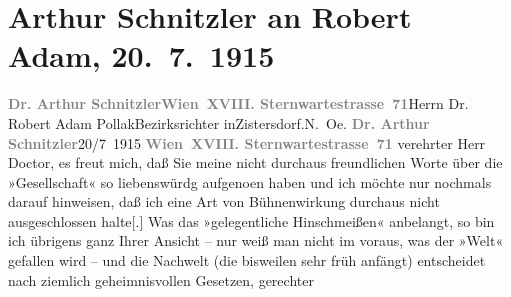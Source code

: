 

         
         \renewcommand{\erwaehntePersonen}{Personen: Robert Adam}
         \renewcommand{\erwaehnteOrte}{Orte: Niederösterreich, Sternwartestraße, Wien, XVIII., Währing, Zistersdorf}
         \renewcommand{\erwaehnteWerke}{Werke: Gesellschaft [Eine Gaunerkomödie], Rechtsphilosophie}
               \section[Arthur Schnitzler an Robert Adam, 20. 7. 1915]{ Arthur Schnitzler an Robert Adam, 20. 7. 1915}\nopagebreak{}\rehead{ }\begin{ledgroupsized}[t]{13cm}\normalsize\beginnumbering \toendnotes[C]{\smallbreak\pagebreak[2]} 
\pstart{}{\pb}\textcolor{gray}{\textbf{Dr. Arthur Schnitzler}}\pend{}\pstart{}\textcolor{gray}{\textbf{Wien XVIII. Sternwartestrasse 71}}\pend{}{\bigskip}\pstart{}{\pb}Herrn Dr. Robert Adam Pollak\pend{}\pstart{}Bezirksrichter in\pend{}\pstart{}Zistersdorf.\pend{}\pstart{}N. Oe.\pend{}{\bigskip}\pstart
           \noindent{}{\pb}\textcolor{gray}{\textbf{Dr. Arthur Schnitzler}}\hfill 20/7 1915\pend
           \pstart
           \textcolor{gray}{\textbf{Wien XVIII. Sternwartestrasse 71}}\pend
           \pstart
           verehrter Herr Doctor, es freut mich, daß Sie meine nicht durchaus
               freundlichen Worte über die »Gesellschaft« so
               liebenswürdg aufgeno{\geminationm}en haben und ich möchte nur
               nochmals darauf hinweisen, daß ich eine Art von Bühnenwirkung durchaus nicht
               ausgeschlossen halte{[}.{]} Was das »gelegentliche Hinschmeißen«
               anbelangt, so bin ich übrigens ganz Ihrer Ansicht – nur weiß man nicht im voraus, was
               der »Welt« gefallen wird – und die Nachwelt (die bisweilen sehr früh anfängt) ent{\pb}scheidet nach ziemlich geheimnisvollen Gesetzen, gerechter

\end{ledgroupsized}
